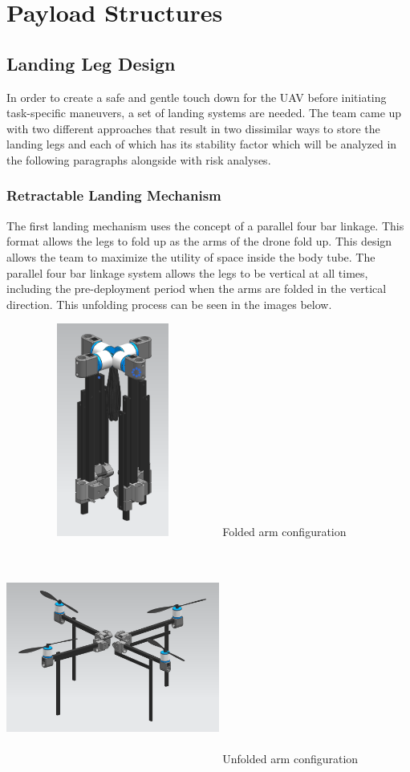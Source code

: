 \section{Payload Structures}\label{PL:Tradeoffs:Structures}
	\subsection{Landing Leg Design}
		In order to create a safe and gentle touch down for the UAV before initiating task-specific maneuvers, a set of landing systems are needed. The team came up with two different approaches that result in two dissimilar ways to store the landing legs and each of which has its stability factor which will be analyzed in the following paragraphs alongside with risk analyses.
		\subsubsection{Retractable Landing Mechanism}
			The first landing mechanism uses the concept of a parallel four bar linkage. This format allows the legs to fold up as the arms of the drone fold up. This design allows the team to maximize the utility of space inside the body tube. The parallel four bar linkage system allows the legs to be vertical at all times, including the pre-deployment period when the arms are folded in the vertical direction. This unfolding process can be seen in the images below.

            \includegraphics[width = 7cm, height = 7cm]{img/PL/folded.PNG}
            Folded arm configuration

            \includegraphics[width = 7cm, height = 7cm]{img/PL/unfolded.PNG}
            Unfolded arm configuration

